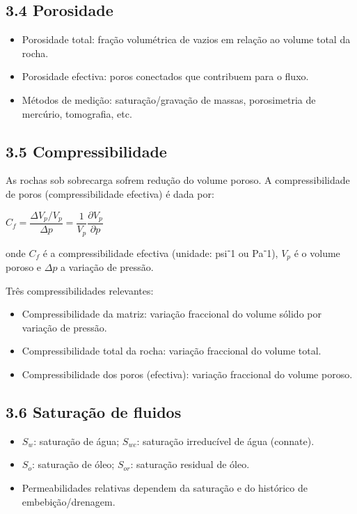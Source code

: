 \documentclass[11pt,a4paper]{article}
\begin{document}
\subsection{3.4 Porosidade}
\begin{itemize}
\item Porosidade total: fração volumétrica de vazios em relação ao volume total da rocha.
\item Porosidade efectiva: poros conectados que contribuem para o fluxo.
\item Métodos de medição: saturação/gravação de massas, porosimetria de mercúrio, tomografia, etc.
\end{itemize}

\subsection{3.5 Compressibilidade}
As rochas sob sobrecarga sofrem redução do volume poroso. A compressibilidade de poros (compressibilidade efectiva) é dada por:

$C_f = \dfrac{\Delta V_p / V_p}{\Delta p} = \dfrac{1}{V_p}\dfrac{\partial V_p}{\partial p}$

onde $C_f$ é a compressibilidade efectiva (unidade: psi⁻1 ou Pa⁻1), $V_p$ é o volume poroso e $\Delta p$ a variação de pressão.

Três compressibilidades relevantes:
\begin{itemize}
\item Compressibilidade da matriz: variação fraccional do volume sólido por variação de pressão.
\item Compressibilidade total da rocha: variação fraccional do volume total.
\item Compressibilidade dos poros (efectiva): variação fraccional do volume poroso.
\end{itemize}

\subsection{3.6 Saturação de fluidos}
\begin{itemize}
\item $S_w$: saturação de água; $S_{wc}$: saturação irreducível de água (connate). 
\item $S_o$: saturação de óleo; $S_{or}$: saturação residual de óleo.
\item Permeabilidades relativas dependem da saturação e do histórico de embebição/drenagem.
\end{itemize}
\end{document}
